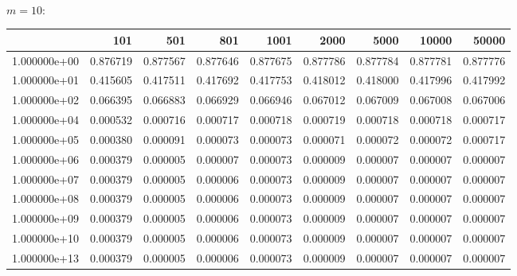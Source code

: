\documentclass[11pt,a4paper]{report}
\begin{document}
\\
$m=10$:
\\
\begin{tabular}{lrrrrrrrr}
\toprule
{} &     101   &     501   &     801   &     1001  &     2000  &     5000  &     10000 &     50000 \\
\midrule
1.000000e+00 &  0.876719 &  0.877567 &  0.877646 &  0.877675 &  0.877786 &  0.877784 &  0.877781 &  0.877776 \\
1.000000e+01 &  0.415605 &  0.417511 &  0.417692 &  0.417753 &  0.418012 &  0.418000 &  0.417996 &  0.417992 \\
1.000000e+02 &  0.066395 &  0.066883 &  0.066929 &  0.066946 &  0.067012 &  0.067009 &  0.067008 &  0.067006 \\
1.000000e+04 &  0.000532 &  0.000716 &  0.000717 &  0.000718 &  0.000719 &  0.000718 &  0.000718 &  0.000717 \\
1.000000e+05 &  0.000380 &  0.000091 &  0.000073 &  0.000073 &  0.000071 &  0.000072 &  0.000072 &  0.000717 \\
1.000000e+06 &  0.000379 &  0.000005 &  0.000007 &  0.000073 &  0.000009 &  0.000007 &  0.000007 &  0.000007 \\
1.000000e+07 &  0.000379 &  0.000005 &  0.000006 &  0.000073 &  0.000009 &  0.000007 &  0.000007 &  0.000007 \\
1.000000e+08 &  0.000379 &  0.000005 &  0.000006 &  0.000073 &  0.000009 &  0.000007 &  0.000007 &  0.000007 \\
1.000000e+09 &  0.000379 &  0.000005 &  0.000006 &  0.000073 &  0.000009 &  0.000007 &  0.000007 &  0.000007 \\
1.000000e+10 &  0.000379 &  0.000005 &  0.000006 &  0.000073 &  0.000009 &  0.000007 &  0.000007 &  0.000007 \\
1.000000e+13 &  0.000379 &  0.000005 &  0.000006 &  0.000073 &  0.000009 &  0.000007 &  0.000007 &  0.000007 \\
\bottomrule
\end{tabular}
\end{document}
